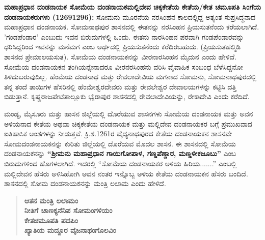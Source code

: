\textbf{ಮಹಾಪ್ರಧಾನ ದಂಡನಾಯಕ ಸೋಮೆಯ ದಂಡನಾಯಕ\general{\enginline{-}}ಮಲ್ಲಿದೇವ   ಚಿಕ್ಕಕೇತೆಯ \general{\enginline{-}}ಕೇತೆಯ/ಕೇತ ಚಮೂಪತಿ  ಸಿಂಗೆಯ ದಂಡನಾಯಕರುಗಳು (1269\general{\enginline{-}}1296):} ಸೋಮನು ಮೂರನೆಯ ನರಸಿಂಹನ ಕಾಲದಲ್ಲಿದ್ದ ಅತ್ಯಂತ ಸುಪ್ರಸಿದ್ಧನಾದ ಮಹಾಪ್ರಧಾನ ದಂಡನಾಯಕ. ಸೋಮನಾಥಪುರ ಶಾಸನದಲ್ಲಿ ಈತನನ್ನು ನರಸಿಂಹನ ಪ್ರಿಯಸುತನೆಂದು ಕರೆಯಲಾಗಿದೆ. 'ಗಂಡಪೆಂಡಾರ' ಎಂಬುದು ಇವನ ಬಿರುದುಗಳಲ್ಲಿ ಒಂದು. ಈತನು ನಾರಸಿಂಹನ ಪರವಾಗಿ ಗಂಡಪೆಂಡಾರವನ್ನು ಧರಿಸಿದ್ದರಿಂದ ಇವನನ್ನು ಮನೆಮಗ ಎಂಬ ಅರ್ಥದಲ್ಲಿ ಪ್ರಿಯಸುತನೆಂದು ಕರೆದಿರಬಹುದು. (ಪ್ರಿಯಸುತ\enginline{-}ಹಲ್ಮಿಡಿ ಶಾಸನದ ಪ್ರೇಮಾಲಯಸುತ). ಸೋಮೆಯ ದಂಡನಾಯಕನನ್ನು ವೀರನಾರಸಿಂಹನ ಮೈದುನ ಎಂದು ಹೇಳಿದೆ. ಸೋಮೆಯ ದಂಡನಾಯಕನ ತಂಗಿಯನ್ನೇನಾ\-ದರೂ ವೀರನರಸಿಂಹನು ವರಿಸಿ ವೈವಾಹಿಕ ಸಂಬಂಧ ಬೆಳೆಸಿದ್ದನೋ ತಿಳಿದುಬರುವುದಿಲ್ಲ. ಹೆಂಮೆಯ ದಂಡನಾಥ ಮತ್ತು ರೇವಲಾದೇವಿಯ ಮಗನಾದ ಸೋಮನು, ಸೋಮನಾಥಪುರದಲ್ಲಿ ತನ್ನ ತಂದೆ ತಾಯಿಗಳ ಹೆಸರಿನಲ್ಲಿ ಹೆಂಮೇಶ್ವರದೇವರು ಮತ್ತು ರೇವಲೇಶ್ವರ ದೇವಾಲಯಗಳನ್ನು ಕಟ್ಟಿಸಿ ದತ್ತಿ ಬಿಡುತ್ತಾನೆ. ಕೃಷ್ಣರಾಜಪೇಟೆ\break ತಾಲ್ಲೂಕು ಭೈರಾಪುರ ಶಾಸನದಲ್ಲಿ ರೇವಲಾದೇವಿಯನ್ನು, ರೇಕಾದೇವಿ ಎಂದು ಕರೆದಿದೆ.

\newpage

ಮಂಡ್ಯ, ಮೈಸೂರು ಮತ್ತು ಹಾಸನ ಜಿಲ್ಲೆಯಲ್ಲಿ ದೊರೆಯುವ ಶಾಸನಗಳು ಸೋಮೆಯ ದಂಡನಾಯಕ ಮತ್ತು ಅವನ ಅಳಿಯನಾದ ಕೇತೆಯ ಅಥವಾ ಚಿಕ್ಕಕೇತೆಯ ದಂಡನಾಯಕ ಮತ್ತು ಮಲ್ಲಿದೇವ ದಂಡನಾಯಕರ ಬಗ್ಗೆ ಪ್ರಮುಖವಾದ ಐತಿಹಾಸಿಕ ಅಂಶಗಳನ್ನು ನೀಡುತ್ತವೆ. ಕ್ರಿ.ಶ.1261ರ ವೈದ್ಯನಾಥಪುರದ ಕೇತೆಯ ದಂಡನಾಯಕನ ಶಾಸನವೇ ಸೋಮದಂಡನಾಯಕನನ್ನು ಕುರಿತು ಜಿಲ್ಲೆಯಲ್ಲಿ ದೊರೆಯವ ಮೊದಲ ಶಾಸನ. ಈ ಶಾಸನದಲ್ಲಿ ಸೋಮೆಯ ದಂಡನಾಯಕನನ್ನು \textbf{“ಶ‍್ರೀಮನು ಮಹಾಪ್ರಧಾನ ಗಾಯಿಗೋಪಾಳ, ಗಣ್ಡಪೆಣ್ಡಾರ, ಮಣ್ಡಳೀಕಜೂಬು”} ಎಂಬ ಬಿರುದುಗಳಿಂದ ಹೊಗಳಲಾಗಿದೆ. ಇದರಲ್ಲಿ “ಸೋಮೆಯ ದಂಡನಾಯಕರ ಅಳಿಯ ಹಿರಿಯ.......” ಎಂಬಲ್ಲಿ ಮಲ್ಲಿದೇವನ ಹೆಸರು ಅಳಿಸಿಹೋಗಿ ಅವನ ನಂತರ ಇನ್ನೊಬ್ಬ ಅಳಿಯ ಕೇತೆಯ ದಂಡನಾಯಕನ ಹೆಸರು ಬಂದಿದೆ. ಶಾಸನದಲ್ಲಿ ಸೋಮ ದಂಡನಾಯಕನನ್ನು ಮಂತ್ರಿ ಲಲಾಮ ಎಂದು ಹೇಳಿದೆ.

\vskip 2pt

\begin{verse}
\textbf{ಆತನ ಮಂತ್ರಿ ಲಲಾಮಂ} \\\textbf{ನೀತಿಗೆ ಚಾಣಕ್ಯನೆನಿಪ ಸೋಮಂಗಳಿಯಂ } \\\textbf{ಕೇತಚಮೂಪತಿ ಪದಪಿಂ} \\\textbf{ಖ್ಯಾತಿಯ ಮದ್ದೂರ ವೈಜನಾಥಂಗೊಲವಿಂ}
\end{verse}

